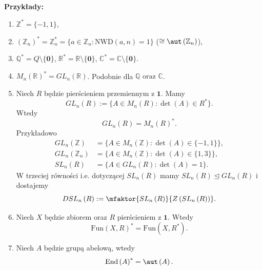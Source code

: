 \noindent \textbf{Przykłady:} 
\begin{enumerate}[label=\arabic*)]
	\item $\mathbb{Z} ^{\ast}=\{-1, 1\} $,
	\item $\left( \mathbb{Z} _{n} \right)^{\ast} = \mathbb{Z}_{n}^{\ast} = \{a \in \mathbb{Z} _{n}: \text{NWD}\left( a,n \right) = 1\} $ ($\cong \aut\left(\mathbb{Z}_{n}\right) $),
	\item $\mathbb{Q} ^{\ast} = Q\setminus \{\mathbf{0}\} $, $\mathbb{R} ^{\ast} = \mathbb{R} \setminus \{\mathbf{0}\}$, $\mathbb{C} ^{\ast} = \mathbb{C} \setminus \{\mathbf{0}\} $.
	\item $M_{n}\left( \mathbb{R}  \right) ^{\ast} = GL_{n}\left( \mathbb{R}  \right) $. Podobnie dla $\mathbb{Q} \text{ oraz }\mathbb{C} $.
	\item Niech $R$ będzie pierścieniem przemiennym z $\mathbf{1}$.
		Mamy 
		\[
		GL_{n} (R) := \{A\in M_{n}\left( R \right) : \det\left( A \right) \in R^{\ast} \} 
		.\] 
		Wtedy
		\[
		GL_{n} \left( R \right) = M_{n}\left( R \right) ^{\ast} 
		.\] 
	\noindent Przykładowo
	\begin{align*}
		GL_{n} \left( \mathbb{Z}  \right) &= \{A\in M_{n} \left( \mathbb{Z}  \right): \det\left( A \right) \in \{-1,1\}  \}, \\
		GL_{n} \left( \mathbb{Z} _{n}  \right) &= \{A\in M_{n} \left( \mathbb{Z}  \right): \det\left( A \right) \in \{1,3\}  \}, \\
		SL_{n} \left( R \right) &= \{A \in GL_{n} \left( R \right) : \det\left( A \right)  = 1\} 
	.\end{align*}
	W trzeciej równości i.e. dotyczącej $SL_{n} \left( R \right) $ mamy $SL_{n} \left( R \right) \unlhd GL_{n} \left( R \right) $ i dostajemy 
	\[
	DSL_{n}\left( R \right) := \mfaktor{SL_{n} \left(R\right)}{Z\left( SL_{n}\left( R \right)   \right) } 
	.\] 
	\item Niech $X$ będzie zbiorem oraz $R$ pierścieniem z $\mathbf{1}$. Wtedy
		\[
		\text{Fun}\left( X,R \right) ^{\ast} = \text{Fun}\left( X, R^{\ast}  \right) 
		.\] 
	\item Niech $A$ będzie grupą abelową, wtedy
		\[
		\text{End}\left( A \right) ^{\ast} = \aut\left(A\right) 
		.\] 
\end{enumerate}
